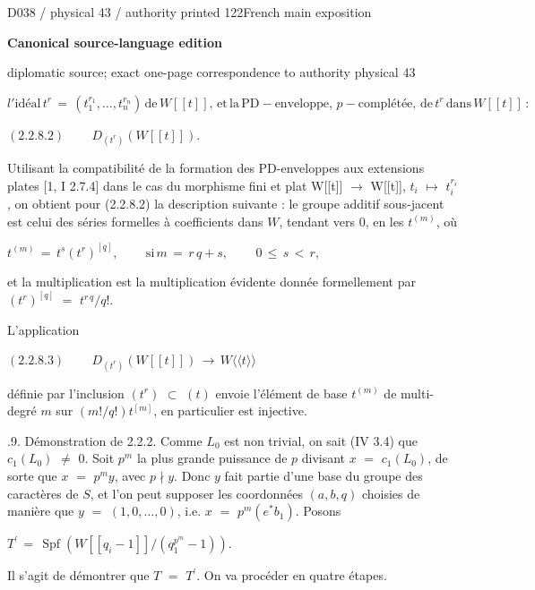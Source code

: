 \documentclass[9pt]{article}
\newcommand{\CanonText}[1]{\par{\fontsize{8.0}{9.35}\selectfont\RaggedRight #1\par}\vspace{2.2pt}}
\newcommand{\CanonDisplay}[1]{\par\vspace{1.2pt}\begin{center}{\fontsize{7.2}{8.4}\selectfont\(\displaystyle #1\)}\end{center}\vspace{1.2pt}}
\newcommand{\LayerTitle}{Canonical source-language edition}
\begin{document}
\noindent\begin{minipage}[t][\dimexpr\textheight-5pt\relax][t]{\textwidth}
{\sffamily\fontsize{7.3}{8.2}\selectfont\color{Quiet} D038 / physical 43 / authority printed 122\hfill French main exposition}
\par{}\vspace{4.5pt}
{\sffamily\fontsize{10.4}{11.6}\selectfont\bfseries\color{Accent} \LayerTitle}
\par{\sffamily\fontsize{6.7}{7.7}\selectfont\color{Quiet} diplomatic source; exact one-page correspondence to authority physical 43}
\vspace{5pt}
\CanonDisplay{l'\text{idéal}\,t^{r}\,=\,(t_{1}^{r_{1}},\ldots{},t_{n}^{r_{n}})\,\text{de}\,W[[t]],\,\mathrm{et}\,\text{la}\,\mathrm{PD}-\text{enveloppe},\,p-\text{complétée},\,\text{de}\,t^{r}\,\text{dans}\,W[[t]]\,:}
\CanonDisplay{(2.2.8.2)\qquad\,D_{(t^{r})}(W[[t]]).}
\CanonText{Utilisant la compatibilité de la formation des PD-enveloppes aux extensions plates [1, I 2.7.4] dans le cas du morphisme fini et plat W[[t]] \(\to{}\) W[[t]], \(t_{i}\) \(\mapsto{}\) \(t_{i}^{r_{i}}\), on obtient pour (2.2.8.2) la description suivante : le groupe additif sous-jacent est celui des séries formelles à coefficients dans \(W\), tendant vers 0, en les \(t^{(m)}\), où}
\CanonDisplay{t^{(m)}\,=\,t^{s}(t^{r})^{[q]},\qquad\,\text{si}\,m\,=\,r\,q+s,\qquad\,0\,\leq{}\,s\,<\,r,}
\CanonText{et la multiplication est la multiplication évidente donnée formellement par \((t^{r})^{[q]}\) \(=\) \(t^{r\,q}/q\)!.}
\CanonText{L'application}
\CanonDisplay{(2.2.8.3)\qquad\,D_{(t^{r})}(W[[t]])\,\to{}\,W\langle{}\langle{}t\rangle{}\rangle{}}
\CanonText{définie par l'inclusion \((t^{r})\) \(\subset{}\) \((t)\) envoie l'élément de base \(t^{(m)}\) de multi-degré \(m\) sur \((m!/q!)t^{[m]}\), en particulier est injective.}
\CanonText{2.2.9. Démonstration de 2.2.2. Comme \(L_{0}\) est non trivial, on sait (IV 3.4) que \(c_{1}(L_{0})\) \(\neq{}\) 0. Soit \(p^{m}\) la plus grande puissance de \(p\) divisant \(x\) \(=\) \(c_{1}(L_{0})\), de sorte que \(x\) \(=\) \(p^{m}y\), avec \(p\nmid{}y\). Donc \(y\) fait partie d'une base du groupe des caractères de \(S\), et l'on peut supposer les coordonnées \((a,b,q)\) choisies de manière que \(y\) \(=\) \((1,0,\ldots{},0)\), i.e. \(x\) \(=\) \(p^{m}(e^{*}b_{1})\). Posons}
\CanonDisplay{T^{\prime}\,=\,\operatorname{Spf}(W[[q_{i}-1]]/(q_{1}^{p^{m}}-1)).}
\CanonText{Il s'agit de démontrer que \(T\) \(=\) \(T^{\prime}\). On va procéder en quatre étapes.}

\end{minipage}
\end{document}
